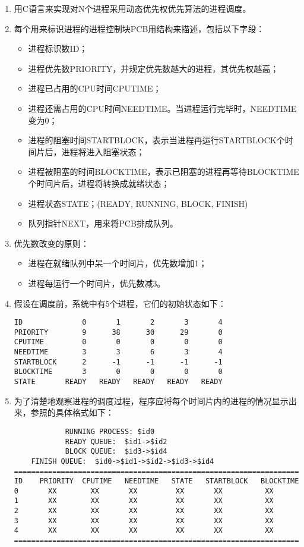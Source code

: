 \documentclass[c5size,a4paper,nofonts]{ctexart}
\begin{document}
\begin{enumerate}[label={(\arabic*)}]
\item 用C语言来实现对N个进程采用动态优先权优先算法的进程调度。
\item 每个用来标识进程的进程控制块PCB用结构来描述，包括以下字段：
\begin{itemize}
\item 进程标识数ID；
\item 进程优先数PRIORITY，并规定优先数越大的进程，其优先权越高；
\item 进程已占用的CPU时间CPUTIME；
\item 进程还需占用的CPU时间NEEDTIME。当进程运行完毕时，NEEDTIME变为0；
\item 进程的阻塞时间STARTBLOCK，表示当进程再运行STARTBLOCK个时间片后，进程将进入阻塞状态；
\item 进程被阻塞的时间BLOCKTIME，表示已阻塞的进程再等待BLOCKTIME个时间片后，进程将转换成就绪状态；
\item 进程状态STATE；(READY, RUNNING, BLOCK, FINISH)
\item 队列指针NEXT，用来将PCB排成队列。
\end{itemize}
\item 优先数改变的原则：
\begin{itemize}
\item 进程在就绪队列中呆一个时间片，优先数增加1；
\item 进程每运行一个时间片，优先数减3。
\end{itemize}
\item 假设在调度前，系统中有5个进程，它们的初始状态如下：
\begin{Verbatim}
ID              0       1       2       3       4
PRIORITY        9      38      30      29       0
CPUTIME         0       0       0       0       0
NEEDTIME        3       3       6       3       4
STARTBLOCK      2      -1      -1      -1      -1
BLOCKTIME       3       0       0       0       0
STATE       READY   READY   READY   READY   READY
\end{Verbatim}
\item 为了清楚地观察进程的调度过程，程序应将每个时间片内的进程的情况显示出来，参照的具体格式如下：
\begin{Verbatim}
            RUNNING PROCESS: $id0
            READY QUEUE:  $id1->$id2
            BLOCK QUEUE:  $id3->$id4
    FINISH QUEUE:  $id0->$id1->$id2->$id3->$id4
====================================================================
ID    PRIORITY  CPUTIME   NEEDTIME   STATE   STARTBLOCK   BLOCKTIME
0       XX        XX       XX         XX       XX          XX
1       XX        XX       XX         XX       XX          XX
2       XX        XX       XX         XX       XX          XX
3       XX        XX       XX         XX       XX          XX
4       XX        XX       XX         XX       XX          XX   
====================================================================
\end{Verbatim}

\end{enumerate}
\end{document}
